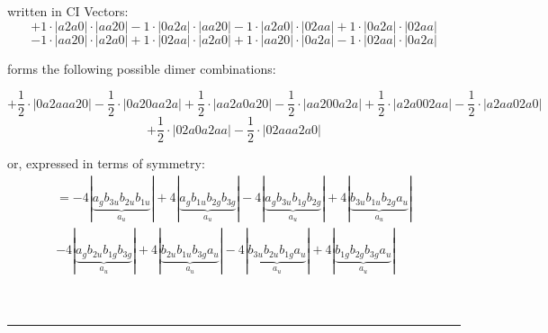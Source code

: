 \documentclass{article}
\begin{document}
\begin{minipage}{\linewidth}
written in CI Vectors: 
 $$+ 1 \cdot \left|a2a0 \right| \cdot \left| aa20 \right| 
- 1 \cdot \left|0a2a \right| \cdot \left| aa20 \right| 
- 1 \cdot \left|a2a0 \right| \cdot \left| 02aa \right| 
+ 1 \cdot \left|0a2a \right| \cdot \left| 02aa \right| 
 $$ $$ - 1 \cdot \left|aa20 \right| \cdot \left| a2a0 \right| 
+ 1 \cdot \left|02aa \right| \cdot \left| a2a0 \right| 
+ 1 \cdot \left|aa20 \right| \cdot \left| 0a2a \right| 
- 1 \cdot \left|02aa \right| \cdot \left| 0a2a \right| 
$$



 forms the following possible dimer combinations:

$$+ \frac{1}{2} \cdot \left|0a2aaa20 \right| - \frac{1}{2} \cdot \left|0a20aa2a \right| + \frac{1}{2} \cdot \left|aa2a0a20 \right| - \frac{1}{2} \cdot \left|aa200a2a \right| + \frac{1}{2} \cdot \left|a2a002aa \right| - \frac{1}{2} \cdot \left|a2aa02a0 \right|  $$ $$ + \frac{1}{2} \cdot \left|02a0a2aa \right| - \frac{1}{2} \cdot \left|02aaa2a0 \right| $$



\end{minipage}
\vspace{0.5cm}


or, expressed in terms of symmetry:\begin{multline*}
=-4\left|\underbrace{a_{g} b_{3u} b_{2u} b_{1u}}_{a_{u}}\right|+4\left|\underbrace{a_{g} b_{1u} b_{2g} b_{3g}}_{a_{u}}\right|-4\left|\underbrace{a_{g} b_{3u} b_{1g} b_{2g}}_{a_{u}}\right|+4\left|\underbrace{b_{3u} b_{1u} b_{2g} a_{u}}_{a_{u}}\right|\\
-4\left|\underbrace{a_{g} b_{2u} b_{1g} b_{3g}}_{a_{u}}\right|+4\left|\underbrace{b_{2u} b_{1u} b_{3g} a_{u}}_{a_{u}}\right|-4\left|\underbrace{b_{3u} b_{2u} b_{1g} a_{u}}_{a_{u}}\right|+4\left|\underbrace{b_{1g} b_{2g} b_{3g} a_{u}}_{a_{u}}\right|
\end{multline*}\\\\

 


\hrule
\vspace{0.5cm}
\end{document}
